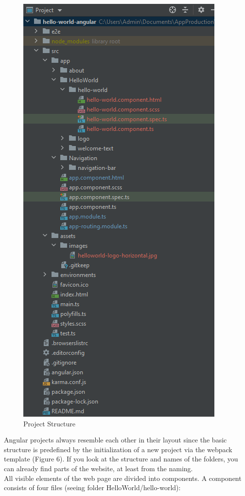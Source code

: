 \newpage
\begin{figure}[H]
    \centering
    \includegraphics[height=0.5\textheight]{./images/SamplePage_ProjectStructure}
    \caption{Project Structure}
    \label{fig:figure42}
\end{figure}
\newline

Angular projects always resemble each other in their layout since the basic structure is predefined by the
initialization of a new project via the webpack template (Figure 6).
If you look at the structure and names of the folders, you can already find parts of the website, at least from the
naming. \\
All visible elements of the web page are divided into components.
A component consists of four files (seeing folder HelloWorld/hello-world):

